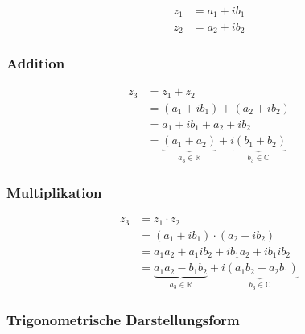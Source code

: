 \begin{align*}
	z_1 & = a_1 + i b_1 \\
	z_2 & = a_2 + i b_2
\end{align*}


\subsubsection{Addition}


\begin{align*}
	z_3 & = z_1 + z_2                                       \\
	    & = (a_1 + i b_1) + (a_2 + i b_2)                   \\
	    & = a_1 + i b_1 + a_2 + i b_2                       \\
	    & = \underbrace{(a_1 + a_2)}_{a_3 \in \mathbb{R}} +
	\underbrace{i(b_1 + b_2)}_{b_3 \in \mathbb{C}}
\end{align*}

\subsubsection{Multiplikation}

\begin{align*}
	z_3 & = z_1 \cdot z_2                                         \\
	    & = (a_1 + i b_1) \cdot (a_2 + i b_2)                     \\
	    & = a_1 a_2 + a_1 ib_2 + ib_1 a_2 + ib_1 ib_2             \\
	    & = \underbrace{a_1 a_2 - b_1 b_2}_{a_3 \in \mathbb{R}} +
	\underbrace{i(a_1 b_2 + a_2 b_1)}_{b_3 \in \mathbb{C}}
\end{align*}


\subsubsection{Trigonometrische Darstellungsform}

